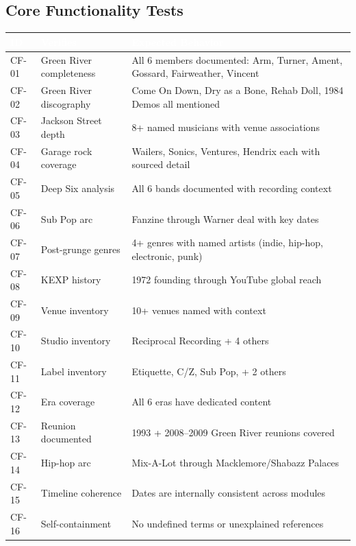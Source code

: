 \documentclass[11pt,letterpaper]{article}
\newcommand{\tableheader}[1]{\textbf{\sffamily\textcolor{white}{#1}}}
\begin{document}
\subsection{Core Functionality Tests}

\begin{center}
\begin{tabularx}{\textwidth}{C{1.2cm}L{3cm}X}
\toprule
{}
\tableheader{ID} & \tableheader{Verifies} & \tableheader{Expected Behavior} \\
\midrule
CF-01 & Green River completeness & All 6 members documented: Arm, Turner, Ament, Gossard, Fairweather, Vincent \\
CF-02 & Green River discography & Come On Down, Dry as a Bone, Rehab Doll, 1984 Demos all mentioned \\
CF-03 & Jackson Street depth & 8+ named musicians with venue associations \\
CF-04 & Garage rock coverage & Wailers, Sonics, Ventures, Hendrix each with sourced detail \\
CF-05 & Deep Six analysis & All 6 bands documented with recording context \\
CF-06 & Sub Pop arc & Fanzine through Warner deal with key dates \\
CF-07 & Post-grunge genres & 4+ genres with named artists (indie, hip-hop, electronic, punk) \\
CF-08 & KEXP history & 1972 founding through YouTube global reach \\
CF-09 & Venue inventory & 10+ venues named with context \\
CF-10 & Studio inventory & Reciprocal Recording + 4 others \\
CF-11 & Label inventory & Etiquette, C/Z, Sub Pop, + 2 others \\
CF-12 & Era coverage & All 6 eras have dedicated content \\
CF-13 & Reunion documented & 1993 + 2008--2009 Green River reunions covered \\
CF-14 & Hip-hop arc & Mix-A-Lot through Macklemore/Shabazz Palaces \\
CF-15 & Timeline coherence & Dates are internally consistent across modules \\
CF-16 & Self-containment & No undefined terms or unexplained references \\
\bottomrule
\end{tabularx}
\end{center}
\end{document}
